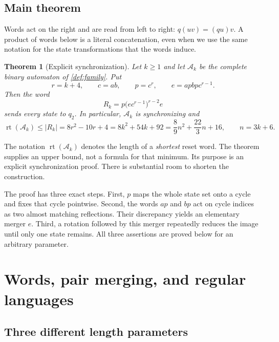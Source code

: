 \documentclass[11pt,a4paper]{article}
\numberwithin{equation}{section}
\newtheorem{theorem}{Theorem}[section]
\theoremstyle{definition}
\theoremstyle{remark}
\newcommand{\Ak}{\mathcal A_k}
\newcommand{\rt}{\operatorname{rt}}
\begin{document}
\subsection{Main theorem}

Words act on the right and are read from left to right: $q(uv)=(qu)v$.
A product of words below is a literal concatenation, even when we use the
same notation for the state transformations that the words induce.

\begin{theorem}[Explicit synchronization]\label{thm:main}
Let $k\geq1$ and let $\Ak$ be the complete binary automaton of
\cref{def:family}. Put
\begin{equation}\label{eq:mainwords}
 r=k+4,\qquad c=ab,\qquad p=c^r,\qquad
 e=a p b p c^{r-1}.
\end{equation}
Then the word
\begin{equation}\label{eq:resetword}
 R_k=p\bigl(e c^{r-1}\bigr)^{r-2}e
\end{equation}
sends every state to $q_2$. In particular, $\Ak$ is synchronizing and
\begin{equation}\label{eq:lengthmain}
 \rt(\Ak)\leq |R_k|=8r^2-10r+4
 =8k^2+54k+92
 =\frac89n^2+\frac{22}{3}n+16,
 \qquad n=3k+6.
\end{equation}
\end{theorem}

The notation $\rt(\Ak)$ denotes the length of a \emph{shortest} reset word.
The theorem supplies an upper bound, not a formula for that minimum. Its
purpose is an explicit synchronization proof. There is substantial room to
shorten the construction.

The proof has three exact steps. First, $p$ maps the whole state set onto a
cycle and fixes that cycle pointwise. Second, the words $ap$ and $bp$ act on
cycle indices as two almost matching reflections. Their discrepancy yields
an elementary merger $e$. Third, a rotation followed by this merger repeatedly
reduces the image until only one state remains. All three assertions are
proved below for an arbitrary parameter.

\section{Words, pair merging, and regular languages}
\label{sec:basics}

\subsection{Three different length parameters}
\end{document}

